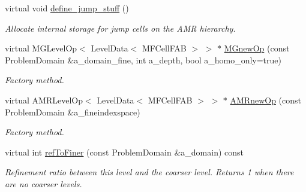 \begin{DoxyCompactItemize}
virtual void \hyperlink{classnwomfconductivityopfactory_add3e26bbe2366c2f75ecd09b4875388c}{define\+\_\+jump\+\_\+stuff} ()
\begin{DoxyCompactList}\small\item\em Allocate internal storage for jump cells on the A\+MR hierarchy. \end{DoxyCompactList}\item 
virtual M\+G\+Level\+Op$<$ Level\+Data$<$ M\+F\+Cell\+F\+AB $>$ $>$ $\ast$ \hyperlink{classnwomfconductivityopfactory_a3c983f4f6cb83bc90fb3efcee63d5e57}{M\+Gnew\+Op} (const Problem\+Domain \&a\+\_\+domain\+\_\+fine, int a\+\_\+depth, bool a\+\_\+homo\+\_\+only=true)
\begin{DoxyCompactList}\small\item\em Factory method. \end{DoxyCompactList}\item 
virtual A\+M\+R\+Level\+Op$<$ Level\+Data$<$ M\+F\+Cell\+F\+AB $>$ $>$ $\ast$ \hyperlink{classnwomfconductivityopfactory_a9ae06ff3e799e4fdeb976e9ff3e25def}{A\+M\+Rnew\+Op} (const Problem\+Domain \&a\+\_\+fineindexspace)
\begin{DoxyCompactList}\small\item\em Factory method. \end{DoxyCompactList}\item 
virtual int \hyperlink{classnwomfconductivityopfactory_a550f546aa6152204e1dce61c011c10ec}{ref\+To\+Finer} (const Problem\+Domain \&a\+\_\+domain) const 
\begin{DoxyCompactList}\small\item\em Refinement ratio between this level and the coarser level. Returns 1 when there are no coarser levels. \end{DoxyCompactList}\end{DoxyCompactItemize}
